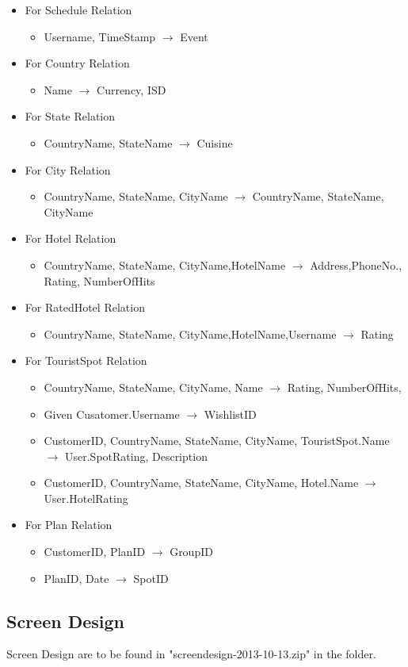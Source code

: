 \documentclass[11pt]{article}
\begin{document}
\begin{itemize}
\item For Schedule Relation
\begin{itemize}
\item Username, TimeStamp $\rightarrow$ Event
\end{itemize}
\item For Country Relation
\begin{itemize}
\item Name $\rightarrow$ Currency, ISD
\end{itemize}
\item For State Relation
\begin{itemize}
\item CountryName, StateName $\rightarrow$ Cuisine
\end{itemize}
\item For City Relation
\begin{itemize}
\item CountryName, StateName, CityName $\rightarrow$ CountryName, StateName, CityName 
\end{itemize}
\item For Hotel Relation
\begin{itemize}
\item CountryName, StateName, CityName,HotelName $\rightarrow$ Address,PhoneNo., Rating, NumberOfHits 
\end{itemize}
\item For RatedHotel Relation
\begin{itemize}
\item CountryName, StateName, CityName,HotelName,Username $\rightarrow$ Rating
\end{itemize}
\item For TouristSpot Relation
\begin{itemize}
\item CountryName, StateName, CityName, Name $\rightarrow$ Rating, NumberOfHits,
\item Given Cusatomer.Username $\rightarrow$ WishlistID
\item CustomerID, CountryName, StateName, CityName, TouristSpot.Name $\rightarrow$ User.SpotRating, Description
\item CustomerID, CountryName, StateName, CityName, Hotel.Name $\rightarrow$ User.HotelRating
\end{itemize}
\item For Plan Relation
\begin{itemize}
\item CustomerID, PlanID $\rightarrow$ GroupID
\item PlanID, Date $\rightarrow$ SpotID
\end{itemize}
\end{itemize}

\subsection*{Screen Design}
Screen Design are to be found in "screendesign-2013-10-13.zip" in the folder.
\end{document}
